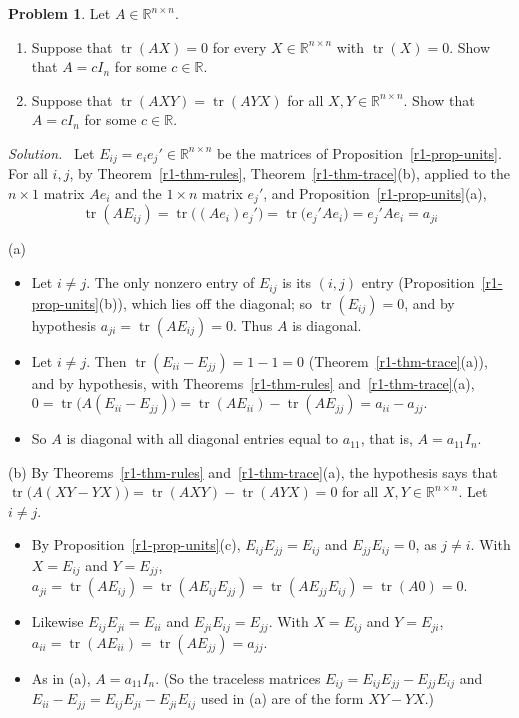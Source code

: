 \documentclass[12pt]{article}
\newcommand{\R}{\mathbb R}
\DeclareMathOperator{\tr}{tr}
\theoremstyle{definition}
\newtheorem{problem}{Problem}
\newenvironment{solution}{\par\noindent\textit{Solution.}\ }{\par\smallskip}
\begin{document}
\begin{problem}\label{r1-ex-pr-trace-scalar}
Let \(A\in\R^{n\times n}\).
\begin{enumerate}
\item Suppose that \(\tr(AX)=0\) for every \(X\in\R^{n\times n}\) with \(\tr(X)=0\). Show that \(A=cI_n\) for some
\(c\in\R\).
\item Suppose that \(\tr(AXY)=\tr(AYX)\) for all \(X,Y\in\R^{n\times n}\). Show that \(A=cI_n\) for some \(c\in\R\).
\end{enumerate}
\end{problem}
\begin{solution}
Let \(E_{ij}=e_ie_j'\in\R^{n\times n}\) be the matrices of Proposition~\ref{r1-prop-units}. For all \(i,j\), by
Theorem~\ref{r1-thm-rules}, Theorem~\ref{r1-thm-trace}(b), applied to the \(n\times1\) matrix \(Ae_i\) and the
\(1\times n\) matrix \(e_j'\), and Proposition~\ref{r1-prop-units}(a),
\[
\tr(AE_{ij})=\tr\bigl((Ae_i)e_j'\bigr)=\tr\bigl(e_j'Ae_i\bigr)=e_j'Ae_i=a_{ji}
\]

(a)
\begin{itemize}
\item Let \(i\ne j\). The only nonzero entry of \(E_{ij}\) is its \((i,j)\) entry (Proposition~\ref{r1-prop-units}(b)),
which lies off the diagonal; so \(\tr(E_{ij})=0\), and by hypothesis \(a_{ji}=\tr(AE_{ij})=0\). Thus \(A\) is diagonal.
\item Let \(i\ne j\). Then \(\tr(E_{ii}-E_{jj})=1-1=0\) (Theorem~\ref{r1-thm-trace}(a)), and by hypothesis, with
Theorems~\ref{r1-thm-rules} and~\ref{r1-thm-trace}(a),
\(0=\tr\bigl(A(E_{ii}-E_{jj})\bigr)=\tr(AE_{ii})-\tr(AE_{jj})=a_{ii}-a_{jj}\).
\item So \(A\) is diagonal with all diagonal entries equal to \(a_{11}\), that is, \(A=a_{11}I_n\).
\end{itemize}
(b) By Theorems~\ref{r1-thm-rules} and~\ref{r1-thm-trace}(a), the hypothesis says that
\(\tr\bigl(A(XY-YX)\bigr)=\tr(AXY)-\tr(AYX)=0\) for all \(X,Y\in\R^{n\times n}\). Let \(i\ne j\).
\begin{itemize}
\item By Proposition~\ref{r1-prop-units}(c), \(E_{ij}E_{jj}=E_{ij}\) and \(E_{jj}E_{ij}=0\), as \(j\ne i\). With
\(X=E_{ij}\) and \(Y=E_{jj}\), \(a_{ji}=\tr(AE_{ij})=\tr(AE_{ij}E_{jj})=\tr(AE_{jj}E_{ij})=\tr(A0)=0\).
\item Likewise \(E_{ij}E_{ji}=E_{ii}\) and \(E_{ji}E_{ij}=E_{jj}\). With \(X=E_{ij}\) and \(Y=E_{ji}\),
\(a_{ii}=\tr(AE_{ii})=\tr(AE_{jj})=a_{jj}\).
\item As in (a), \(A=a_{11}I_n\). (So the traceless matrices \(E_{ij}=E_{ij}E_{jj}-E_{jj}E_{ij}\) and
\(E_{ii}-E_{jj}=E_{ij}E_{ji}-E_{ji}E_{ij}\) used in (a) are of the form \(XY-YX\).)
\end{itemize}
\end{solution}
\end{document}
